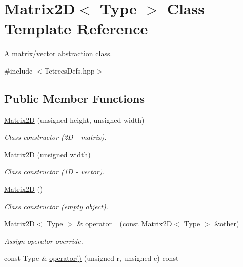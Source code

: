 \hypertarget{classMatrix2D}{}\section{Matrix2D$<$ Type $>$ Class Template Reference}
\label{classMatrix2D}


A matrix/vector abstraction class.  




{\ttfamily \#include $<$Tetrees\+Defs.\+hpp$>$}

\subsection*{Public Member Functions}
\begin{DoxyCompactItemize}
\item 
\hyperlink{classMatrix2D_a6166db3bae116e2f009721534abdb2de}{Matrix2D} (unsigned height, unsigned width)
\begin{DoxyCompactList}\small\item\em Class constructor (2D -\/ matrix). \end{DoxyCompactList}\item 
\hyperlink{classMatrix2D_aab23e73fe109ec1eb39dc442bcb67cbe}{Matrix2D} (unsigned width)
\begin{DoxyCompactList}\small\item\em Class constructor (1D -\/ vector). \end{DoxyCompactList}\item 
\hyperlink{classMatrix2D_a5a6653f697f1c397669bd556c1fd272a}{Matrix2D} ()
\begin{DoxyCompactList}\small\item\em Class constructor (empty object). \end{DoxyCompactList}\item 
\mbox{\label{classMatrix2D_a9c51e9afbf286db8aa8c08a523bbb46c}} 
\hyperlink{classMatrix2D}{Matrix2D}$<$ Type $>$ \& \hyperlink{classMatrix2D_a9c51e9afbf286db8aa8c08a523bbb46c}{operator=} (const \hyperlink{classMatrix2D}{Matrix2D}$<$ Type $>$ \&other)
\begin{DoxyCompactList}\small\item\em Assign operator override. \end{DoxyCompactList}\item 
const Type \& \hyperlink{classMatrix2D_aa9a6df1e7cc653d635baedc659ea00f7}{operator()} (unsigned r, unsigned c) const

\end{DoxyCompactItemize}
